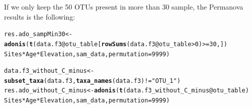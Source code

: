 \documentclass[12pt]{article}\usepackage[]{graphicx}\usepackage[]{color}
\makeatletter
\newcommand{\hlnum}[1]{\textcolor[rgb]{0.686,0.059,0.569}{#1}}%
\newcommand{\hlstr}[1]{\textcolor[rgb]{0.192,0.494,0.8}{#1}}%
\newcommand{\hlopt}[1]{\textcolor[rgb]{0,0,0}{#1}}%
\newcommand{\hlstd}[1]{\textcolor[rgb]{0.345,0.345,0.345}{#1}}%
\newcommand{\hlkwb}[1]{\textcolor[rgb]{0.69,0.353,0.396}{#1}}%
\newcommand{\hlkwc}[1]{\textcolor[rgb]{0.333,0.667,0.333}{#1}}%
\newcommand{\hlkwd}[1]{\textcolor[rgb]{0.737,0.353,0.396}{\textbf{#1}}}%
\newenvironment{kframe}{%
 \def\at@end@of@kframe{}%
 \ifinner\ifhmode%
  \def\at@end@of@kframe{\end{minipage}}%
  \begin{minipage}{\columnwidth}%
 \fi\fi%
 \def\FrameCommand##1{\hskip\@totalleftmargin \hskip-\fboxsep
 \colorbox{shadecolor}{##1}\hskip-\fboxsep
     \hskip-\linewidth \hskip-\@totalleftmargin \hskip\columnwidth}%
 \MakeFramed {\advance\hsize-\width
   \@totalleftmargin\z@ \linewidth\hsize
   \@setminipage}}%
 {\par\unskip\endMakeFramed%
 \at@end@of@kframe}
\newenvironment{knitrout}{}{} %
\numberwithin{figure}{section}
\makeatother
\begin{document}
If we only keep the 50 OTUs present in more than 30 sample, the Permanova results is the following:
\begin{knitrout}\small
{}\color{fgcolor}\begin{kframe}
\begin{alltt}
\hlstd{res.ado_sampMin30} \hlkwb{<-} \hlkwd{adonis}\hlstd{(}\hlkwd{t}\hlstd{(data.f3}\hlopt{@}\hlkwc{otu_table}\hlstd{[}\hlkwd{rowSums}\hlstd{(data.f3}\hlopt{@}\hlkwc{otu_table}\hlopt{>}\hlnum{0}\hlstd{)}\hlopt{>=}\hlnum{30}\hlstd{,])} \hlopt{~}
                              \hlstd{Sites} \hlopt{*} \hlstd{Age} \hlopt{*} \hlstd{Elevation, sam_data,} \hlkwc{permutation} \hlstd{=} \hlnum{9999}\hlstd{)}
\end{alltt}
\end{kframe}
\end{knitrout}

\begin{knitrout}\small
{}\color{fgcolor}\begin{kframe}
\begin{alltt}
\hlstd{data.f3_without_C_minus} \hlkwb{<-} \hlkwd{subset_taxa}\hlstd{(data.f3,} \hlkwd{taxa_names}\hlstd{(data.f3)}\hlopt{!=}\hlstr{"OTU_1"}\hlstd{)}
\hlstd{res.ado_without_C_minus} \hlkwb{<-} \hlkwd{adonis}\hlstd{(}\hlkwd{t}\hlstd{(data.f3_without_C_minus}\hlopt{@}\hlkwc{otu_table}\hlstd{)} \hlopt{~}
                              \hlstd{Sites} \hlopt{*} \hlstd{Age} \hlopt{*} \hlstd{Elevation, sam_data,} \hlkwc{permutation} \hlstd{=} \hlnum{9999}\hlstd{)}
\end{alltt}
\end{kframe}
\end{knitrout}
\end{document}
